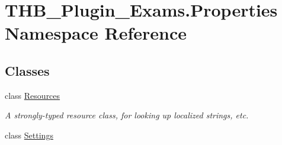 \hypertarget{namespace_t_h_b___plugin___exams_1_1_properties}{}\section{T\+H\+B\+\_\+\+Plugin\+\_\+\+Exams.\+Properties Namespace Reference}
\label{namespace_t_h_b___plugin___exams_1_1_properties}
\subsection*{Classes}
\begin{DoxyCompactItemize}
\item 
class \mbox{\hyperlink{class_t_h_b___plugin___exams_1_1_properties_1_1_resources}{Resources}}
\begin{DoxyCompactList}\small\item\em A strongly-\/typed resource class, for looking up localized strings, etc. \end{DoxyCompactList}\item 
class \mbox{\hyperlink{class_t_h_b___plugin___exams_1_1_properties_1_1_settings}{Settings}}
\end{DoxyCompactItemize}
